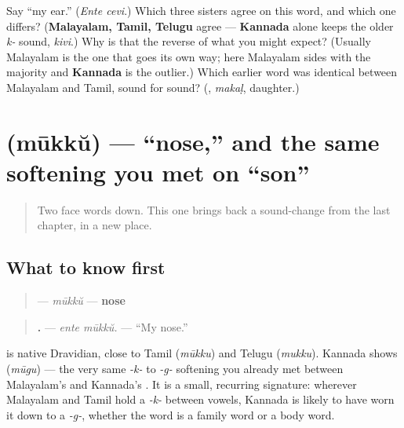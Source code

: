 \begin{tcolorbox}[breakable,colback=teal!4,colframe=teal!35!black,title={Before you move on}]
Say \textquotedblleft{}my ear.\textquotedblright{} (\emph{Ente cevi}.) Which three sisters agree on this word, and which one differs? (\textbf{Malayalam, Tamil, Telugu} agree — \textbf{Kannada} alone keeps the older \emph{k-} sound, \emph{kivi}.) Why is that the reverse of what you might expect? (Usually Malayalam is the one that goes its own way; here Malayalam sides with the majority and \textbf{Kannada} is the outlier.) Which earlier word was identical between Malayalam and Tamil, sound for sound? (\emph{\textbf{}}, \emph{makaḷ}, daughter.)
\end{tcolorbox}
\section[\texorpdfstring{\ml{മൂക്ക്} (mūkkŭ)}{മൂക്ക് (mūkkŭ)}]{ (mūkkŭ) — \textquotedblleft{}nose,\textquotedblright{} and the same softening you met on \textquotedblleft{}son\textquotedblright{}}

\label{lesson:ML-C37-mookku}



\begin{quote}
Two face words down. This one brings back a sound-change from the last chapter, in a new place.
\end{quote}

\subsection*{What to know first}
\begin{quote}
\textbf{} — \emph{mūkkŭ} — \textbf{nose}
\end{quote}

\begin{quote}
\textbf{ .} — \emph{ente mūkkŭ.} — \textquotedblleft{}My nose.\textquotedblright{}
\end{quote}

\begin{cousinweb}
\textbf{} is native Dravidian, close to Tamil \textbf{} (\emph{mūkku}) and Telugu \textbf{} (\emph{mukku}). Kannada shows \textbf{} (\emph{mūgu}) — the very same \emph{-k-} to \emph{-g-} softening you already met between Malayalam's \textbf{} and Kannada's \textbf{}. It is a small, recurring signature: wherever Malayalam and Tamil hold a \emph{-k-} between vowels, Kannada is likely to have worn it down to a \emph{-g-}, whether the word is a family word or a body word.
\end{cousinweb}

